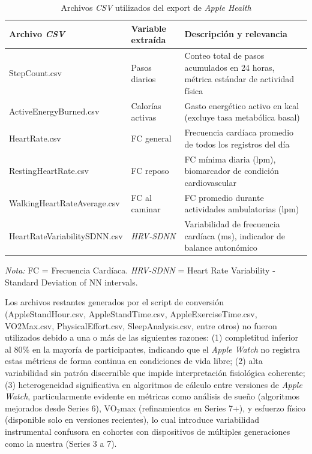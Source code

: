 \begin{table}[H]
\centering
\caption{Archivos \textit{CSV} utilizados del export de \textit{Apple Health}}
\label{tab:archivos_csv_usados}
\small
\begin{tabular}{@{}p{4.5cm}p{3.5cm}p{6cm}@{}}
\toprule
\textbf{Archivo \textit{CSV}} & \textbf{Variable extraída} & \textbf{Descripción y relevancia} \\
\midrule
StepCount.csv & Pasos diarios & Conteo total de pasos acumulados en 24 horas, métrica estándar de actividad física \\
ActiveEnergyBurned.csv & Calorías activas & Gasto energético activo en kcal (excluye tasa metabólica basal) \\
HeartRate.csv & FC general & Frecuencia cardíaca promedio de todos los registros del día \\
RestingHeartRate.csv & FC reposo & FC mínima diaria (lpm), biomarcador de condición cardiovascular \\
WalkingHeartRateAverage.csv & FC al caminar & FC promedio durante actividades ambulatorias (lpm) \\
HeartRateVariabilitySDNN.csv & \textit{HRV-SDNN} & Variabilidad de frecuencia cardíaca (ms), indicador de balance autonómico \\
\bottomrule
\end{tabular}
\begin{flushleft}
\scriptsize
\textit{Nota:} FC = Frecuencia Cardíaca. \textit{HRV-SDNN} = Heart Rate Variability - Standard Deviation of NN intervals.
\end{flushleft}
\end{table}

\FloatBarrier

Los archivos restantes generados por el script de conversión (AppleStandHour.csv, AppleStandTime.csv, AppleExerciseTime.csv, VO2Max.csv, PhysicalEffort.csv, SleepAnalysis.csv, entre otros) no fueron utilizados debido a una o más de las siguientes razones: (1) completitud inferior al 80\% en la mayoría de participantes, indicando que el \textit{Apple Watch} no registra estas métricas de forma continua en condiciones de vida libre; (2) alta variabilidad sin patrón discernible que impide interpretación fisiológica coherente; (3) heterogeneidad significativa en algoritmos de cálculo entre versiones de \textit{Apple Watch}, particularmente evidente en métricas como análisis de sueño (algoritmos mejorados desde Series 6), VO$_2$max (refinamientos en Series 7+), y esfuerzo físico (disponible solo en versiones recientes), lo cual introduce variabilidad instrumental confusora en cohortes con dispositivos de múltiples generaciones como la nuestra (Series 3 a 7).

